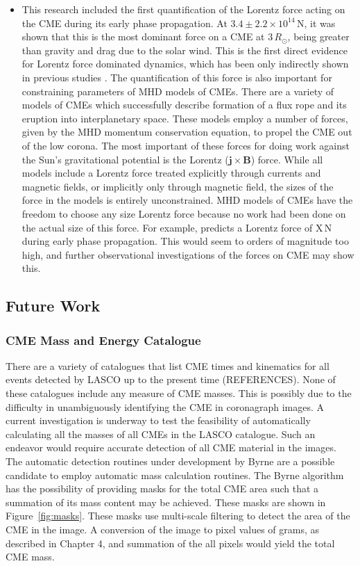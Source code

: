 \begin{itemize}
\item This research included the first quantification of the Lorentz force acting on the CME during its early phase propagation. At $3.4\pm2.2\times10^{14}$\,N, it was shown that this is the most dominant force on a CME at $3\,R_{\odot}$, being greater than gravity and drag due to the solar wind. This is the first direct evidence for Lorentz force dominated dynamics, which has been only indirectly shown in previous studies \citep{bein2011}. The quantification of this force is also important for constraining parameters of MHD models of CMEs. There are a variety of models of CMEs which successfully describe formation of a flux rope and its eruption into interplanetary space. These models employ a number of forces, given by the MHD momentum conservation equation, to propel the CME out of the low corona. The most important of these forces for doing work against the Sun's gravitational potential is the Lorentz ($\mathbf{j}\times\mathbf{B}$) force. While all models include a Lorentz force treated explicitly through currents and magnetic fields, or implicitly only through magnetic field, the sizes of the force in the models is entirely unconstrained. MHD models of CMEs have the freedom to choose any size Lorentz force because no work had been done on the actual size of this force. For example, \citep{chen1996} predicts a Lorentz force of X\,N during early phase propagation. This would seem to orders of magnitude too high, and further observational investigations of the forces on CME may show this.

\end{itemize}

\subsection{Future Work}

\subsubsection{CME Mass and Energy Catalogue}

There are a variety of catalogues that list CME times and kinematics for all events detected by LASCO up to the present time (REFERENCES). None of these catalogues include any measure of CME masses. This is possibly due to the difficulty in unambiguously identifying the CME in coronagraph images. A current investigation is underway to test the feasibility of automatically calculating all the masses of all CMEs in the LASCO catalogue. Such an endeavor would require accurate detection of all CME material in the images. The automatic detection routines under development by Byrne are a possible candidate to employ automatic mass calculation routines. The Byrne algorithm has the possibility of providing masks for the total CME area such that a summation of its mass content may be achieved. These masks are shown in Figure~\ref{fig:masks}. These masks use multi-scale filtering to detect the area of the CME in the image. A conversion of the image to pixel values of grams, as described in Chapter 4, and summation of the all pixels would yield the total CME mass.

